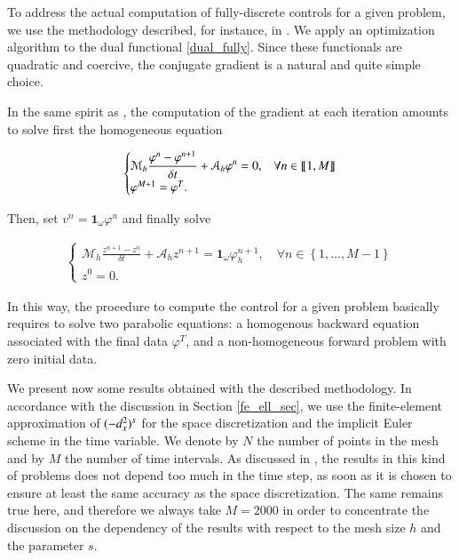 To address the actual computation of fully-discrete controls for a given problem, we use the methodology described, for instance, in \cite{glowinski2008exact}. We apply an optimization algorithm to the dual functional \eqref{dual_fully}. Since these functionals are quadratic and coercive, the conjugate gradient is a natural and quite simple choice.

In the same spirit as \cite{boyer2013penalised}, the computation of the gradient at each iteration amounts to solve first the homogeneous equation 

\begin{align*}
	\begin{cases}
		\displaystyle\mathcal M_h \frac{\varphi^n-\varphi^{n+1}}{\delta t}+\mathcal A_h \varphi^n=0, & \forall n\in\llbracket 1,M\rrbracket
		\\
		\varphi^{M+1}=\varphi^T. 
	\end{cases}
\end{align*}

Then, set $v^n=\mathbf{1}_\omega\varphi^n$ and finally solve 

\begin{align*}
	\begin{cases}
		\displaystyle\mathcal M_h \frac{z^{n+1}-z^n}{\delta t}+\mathcal A_h z^{n+1}=\mathbf{1}_\omega \varphi_h^{n+1}, \quad \forall n\in \left\{1,\ldots,M-1\right\}
		\\
		z^0=0. 
	\end{cases}
\end{align*}

In this way, the procedure to compute the control for a given problem basically requires to solve two parabolic equations: a homogenous backward equation associated with the final data $\varphi^T$, and a non-homogeneous forward problem with zero initial data. 

We present now some results obtained with the described methodology. In accordance with the discussion in Section \ref{fe_ell_sec}, we use the finite-element approximation of $(-d_x^2)^{s}$ for the space discretization and the implicit Euler scheme in the time variable. We denote by $N$ the number of points in the mesh and by $M$ the number of time intervals. As discussed in \cite{boyer2013penalised}, the results in this kind of problems does not depend too much in the time step, as soon as it is chosen to ensure at least the same accuracy as the space discretization. The same remains true here, and therefore we always take $M=2000$ in order to concentrate the discussion on the dependency of the results with respect to the mesh size $h$ and the parameter $s$.

